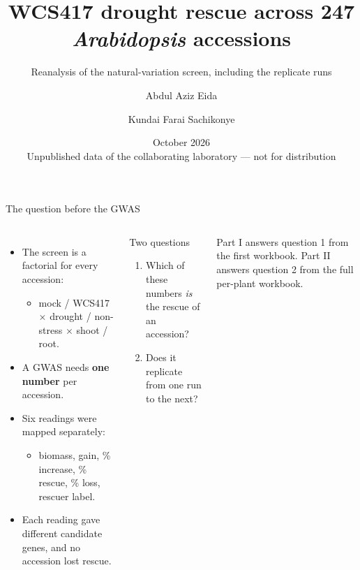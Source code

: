 \documentclass[aspectratio=169,11pt]{beamer}
\title{WCS417 drought rescue across 247 \emph{Arabidopsis} accessions}
\subtitle{Reanalysis of the natural-variation screen, including the replicate runs}
\author{Abdul Aziz Eida \and Kundai Farai Sachikonye}
\date{October 2026 \\[0.5em] \footnotesize Unpublished data of the collaborating laboratory --- not for distribution}
\newcommand{\key}[1]{\textcolor{accent}{\textbf{#1}}}
\begin{document}
\begin{frame}
  \titlepage
\end{frame}

\begin{frame}{The question before the GWAS}
  \begin{columns}[T]
    \begin{itemize}
      \item The screen is a factorial for every accession:
        \begin{itemize}
          \item mock / WCS417 $\times$ drought / non-stress $\times$ shoot / root.
        \end{itemize}
      \item A GWAS needs \key{one number} per accession.
      \item Six readings were mapped separately:
        \begin{itemize}
          \item biomass, gain, \% increase, \% rescue, \% loss, rescuer label.
        \end{itemize}
      \item Each reading gave different candidate genes, and no accession lost rescue.
    \end{itemize}
    \vspace{0.6em}
    \begin{block}{Two questions}
      \begin{enumerate}
        \item Which of these numbers \emph{is} the rescue of an accession?
        \item Does it replicate from one run to the next?
      \end{enumerate}
    \end{block}
    \vspace{0.5em}
    \small Part I answers question 1 from the first workbook. Part II answers question 2
    from the full per-plant workbook.
  \end{columns}
\end{frame}
\end{document}
